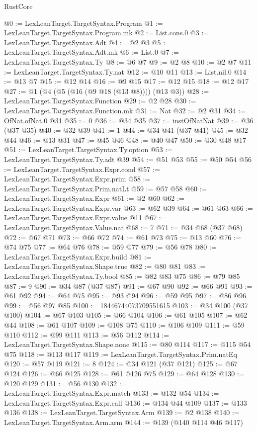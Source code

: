 \begin{lexlean}{RustCore}
\begin{coremodule}
@0 := LexLeanTarget.TargetSyntax.Program
@1 := LexLeanTarget.TargetSyntax.Program.mk
@2 := List.cons.{0}
@3 := LexLeanTarget.TargetSyntax.Adt
@4 := @2 @3
@5 := LexLeanTarget.TargetSyntax.Adt.mk
@6 := List.{0}
@7 := LexLeanTarget.TargetSyntax.Ty
@8 := @6 @7
@9 := @2 @8
@10 := @2 @7
@11 := LexLeanTarget.TargetSyntax.Ty.nat
@12 := @10 @11
@13 := List.nil.{0}
@14 := @13 @7
@15 := @12 @14
@16 := @9 @15
@17 := @12 @15
@18 := @12 @17
@27 := @1 (@4 (@5 (@16 (@9 @18 (@13 @8)))) (@13 @3))
@28 := LexLeanTarget.TargetSyntax.Function
@29 := @2 @28
@30 := LexLeanTarget.TargetSyntax.Function.mk
@31 := Nat
@32 := @2 @31
@34 := OfNat.ofNat.{0} @31
@35 := 0
@36 := @34 @35
@37 := instOfNatNat
@39 := @36 (@37 @35)
@40 := @32 @39
@41 := 1
@44 := @34 @41 (@37 @41)
@45 := @32 @44
@46 := @13 @31
@47 := @45 @46
@48 := @40 @47
@50 := @30 @48 @17
@51 := LexLeanTarget.TargetSyntax.Ty.option
@53 := LexLeanTarget.TargetSyntax.Ty.adt @39
@54 := @51 @53
@55 := @50 @54
@56 := LexLeanTarget.TargetSyntax.Expr.cond
@57 := LexLeanTarget.TargetSyntax.Expr.prim
@58 := LexLeanTarget.TargetSyntax.Prim.natLt
@59 := @57 @58
@60 := LexLeanTarget.TargetSyntax.Expr
@61 := @2 @60
@62 := LexLeanTarget.TargetSyntax.Expr.var
@63 := @62 @39
@64 := @61 @63
@66 := LexLeanTarget.TargetSyntax.Expr.value @11
@67 := LexLeanTarget.TargetSyntax.Value.nat
@68 := 7
@71 := @34 @68 (@37 @68)
@72 := @67 @71
@73 := @66 @72
@74 := @61 @73
@75 := @13 @60
@76 := @74 @75
@77 := @64 @76
@78 := @59 @77
@79 := @56 @78
@80 := LexLeanTarget.TargetSyntax.Expr.build
@81 := LexLeanTarget.TargetSyntax.Shape.true
@82 := @80 @81
@83 := LexLeanTarget.TargetSyntax.Ty.bool
@85 := @82 @83 @75
@86 := @79 @85
@87 := 9
@90 := @34 @87 (@37 @87)
@91 := @67 @90
@92 := @66 @91
@93 := @61 @92
@94 := @64 @75
@95 := @93 @94
@96 := @59 @95
@97 := @86 @96
@99 := @56 @97 @85
@100 := 18446744073709551615
@103 := @34 @100 (@37 @100)
@104 := @67 @103
@105 := @66 @104
@106 := @61 @105
@107 := @62 @44
@108 := @61 @107
@109 := @108 @75
@110 := @106 @109
@111 := @59 @110
@112 := @99 @111
@113 := @56 @112
@114 := LexLeanTarget.TargetSyntax.Shape.none
@115 := @80 @114
@117 := @115 @54 @75
@118 := @113 @117
@119 := LexLeanTarget.TargetSyntax.Prim.natEq
@120 := @57 @119
@121 := 8
@124 := @34 @121 (@37 @121)
@125 := @67 @124
@126 := @66 @125
@128 := @61 @126 @75
@129 := @64 @128
@130 := @120 @129
@131 := @56 @130
@132 := LexLeanTarget.TargetSyntax.Expr.match
@133 := @132 @54
@134 := LexLeanTarget.TargetSyntax.Expr.call
@136 := @134 @44 @109
@137 := @133 @136
@138 := LexLeanTarget.TargetSyntax.Arm
@139 := @2 @138
@140 := LexLeanTarget.TargetSyntax.Arm.arm
@144 := @139 (@140 @114 @46 @117)

\end{coremodule}
\end{lexlean}
